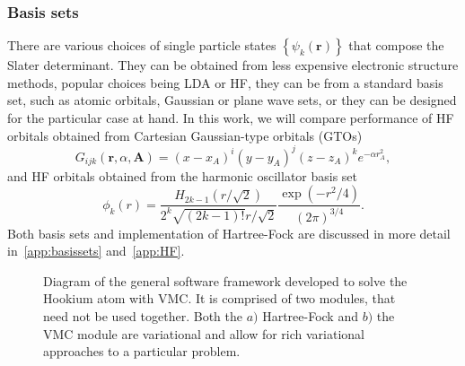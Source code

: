 \documentclass[final,3p,times,twocolumn]{elsarticle}
\begin{document}
	\subsubsection{Basis sets}
	There are various choices of single particle states $\left\{\psi_k(\mathbf{r})\right\}$ that compose the Slater determinant. They can be obtained from less expensive electronic structure methods, popular choices being LDA or HF, they can be from a standard basis set, such as atomic orbitals, Gaussian or plane wave sets, or they can be designed for the particular case at hand. In this work, we will compare performance of HF orbitals obtained from Cartesian Gaussian-type orbitals (GTOs)
	\begin{equation}
	\label{eq:cartG}
	G_{i j k}(\mathbf{r}, \alpha, \mathbf{A})=(x-x_{A})^{i} (y-y_{A})^{j} (z-z_{A})^{k} e^{-\alpha r_{A}^{2}},
	\end{equation}
	and HF orbitals obtained from the harmonic oscillator basis set
	\begin{equation}
		\phi_{k}(r)=\frac{H_{2 k-1}(r / \sqrt{2})}{2^{k} \sqrt{(2 k-1) !} r / \sqrt{2}} \frac{\exp \left(-r^{2} / 4\right)}{(2 \pi)^{3 / 4}}.
	\end{equation}
	Both basis sets and implementation of Hartree-Fock are discussed in more detail in~\ref{app:basissets} and~\ref{app:HF}.  
	
	\begin{figure}[h]
		\vspace*{-2cm}
		\caption{Diagram of the general software framework developed to solve the Hookium atom with VMC. It is comprised of two modules, that need not be used together. Both the $a)$ Hartree-Fock and $b)$ the VMC module are variational and allow for rich variational approaches to a particular problem.}
		\label{fig:software}
	\end{figure}
	
\end{document}
